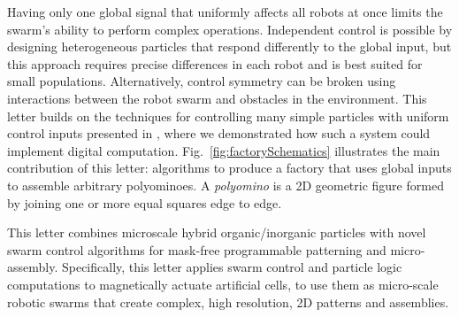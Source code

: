 Having only one global signal that uniformly affects all robots at once
limits the swarm's ability to perform complex operations.
Independent control is possible by designing heterogeneous particles that respond differently to the global input, but this approach requires precise differences in each robot and is best suited for small populations. 
Alternatively, control symmetry can be broken using interactions between the robot swarm and obstacles in the environment. 
This letter builds on the techniques for controlling many simple particles with uniform control inputs presented in \cite{Becker2013f,Becker2014,Becker2014a}, where
we demonstrated how such a system could  implement digital computation.
Fig.~\ref{fig:factorySchematics} illustrates the main contribution of this letter: algorithms to produce a factory that uses global inputs to assemble arbitrary polyominoes.
A \emph{polyomino} is a 2D geometric figure formed by joining one or more equal squares edge to edge.

This letter combines microscale hybrid organic/inorganic particles with novel swarm control algorithms for mask-free programmable patterning and micro-assembly. 
Specifically, this letter applies swarm control and particle logic computations to magnetically actuate artificial cells, to use them as micro-scale robotic swarms that create complex, high resolution, 2D patterns and assemblies.

